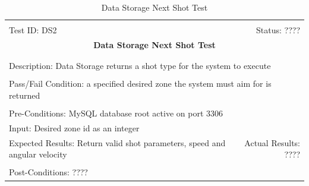 \documentclass[11pt]{article}
\begin{document}
\begin{center}
\begin{table}[H]
\begin{tabular}{|l r|}\hline&\\[-2mm]
	Test ID: DS2	&Status: ????\\[-3mm]
	\multicolumn{2}{|c|}{\textbf{\large{Data Storage Next Shot Test}}}\\&\\\hline&\\[-3mm]
	\multicolumn{2}{|p{\textwidth}|}{Description: Data Storage returns a shot type for the system to execute}\\[1mm]\hline&\\[-3mm]
	\multicolumn{2}{|p{\textwidth}|}{Pass/Fail Condition: a specified desired zone the system must aim for is returned}\\[1mm]\hline&\\[-3mm]
	\multicolumn{2}{|p{\textwidth}|}{Pre-Conditions: MySQL database root active on port 3306}\\[4mm]
	\multicolumn{2}{|p{\textwidth}|}{Input: Desired zone id as an integer}\\[2mm]\hline
	\multicolumn{1}{|p{0.49\textwidth}}{Expected Results: Return valid shot parameters, speed and angular velocity}	&\multicolumn{1}{|p{0.45\textwidth}|}{Actual Results: ????}\\\hline&\\[-3mm]
	\multicolumn{2}{|p{\textwidth}|}{Post-Conditions: ????}\\\hline
\end{tabular}
\caption{Data Storage Next Shot Test}
\end{table}
\end{center}
\end{document}
